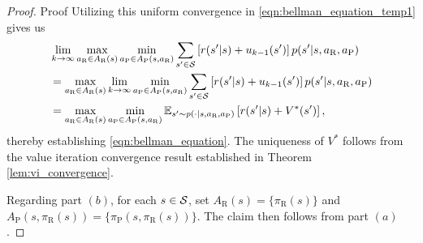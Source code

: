 \documentclass[opre,dblanonrev]{informs4}
\begin{document}
\begin{APPENDICES}
\begin{proof}{Proof}
           Utilizing this uniform convergence in \eqref{eqn:bellman_equation_temp1} gives us 
           \begin{align*}
           &\lim_{k \to \infty}\max_{a_\text{R} \in A_\text{R}(s)}\min_{a_\text{P} \in A_\text{P}(s,a_\text{R})}\sum_{s' \in {\cal S}}\left[r(s'|s) + u_{k-1}(s')\right]p(s'|s,a_\text{R},a_\text{P})\\
           &= \max_{a_\text{R} \in A_\text{R}(s)}\lim_{k \to \infty}\min_{a_\text{P} \in A_\text{P}(s,a_\text{R})}\sum_{s' \in {\cal S}}\left[r(s'|s) + u_{k-1}(s')\right]p(s'|s,a_\text{R},a_\text{P})\\
           &= \max_{a_\text{R} \in A_\text{R}(s)}\min_{a_\text{P} \in A_\text{P}(s,a_\text{R})}\mathbb{E}_{s' \sim p(\cdot|s,a_\text{R},a_\text{P})}\left[r(s'|s) + V^*(s')\right],
           \end{align*}
           thereby establishing \eqref{eqn:bellman_equation}. The uniqueness of $V^*$ follows from the value iteration convergence result established in Theorem \ref{lem:vi_convergence}.
    
           Regarding part $(b)$, for each $s \in {\cal S}$, set $A_\text{R}(s) = \{\pi_\text{R}(s)\}$ and $A_\text{P}(s,\pi_\text{R}(s)) = \{\pi_\text{P}(s,\pi_\text{R}(s))\}$. The claim then  follows from part $(a)$.\Halmos
       \end{proof}
    

\end{APPENDICES}
\end{document}
